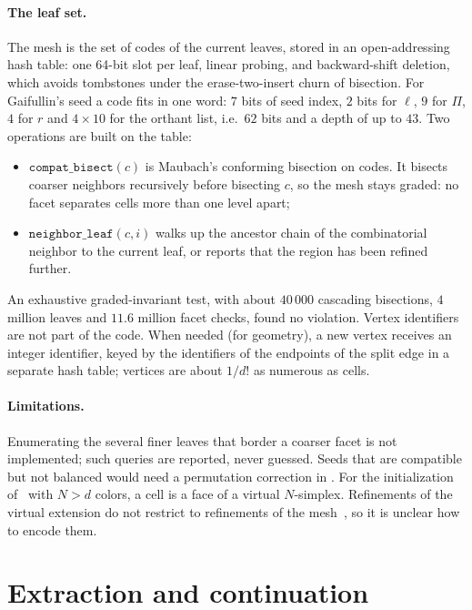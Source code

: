 \documentclass[11pt]{article}
\theoremstyle{plain}
\theoremstyle{definition}
\theoremstyle{remark}
\begin{document}
\paragraph{The leaf set.}
\label{sec:leafset}
The mesh is the set of codes of the current leaves, stored in an
open-addressing hash table: one 64-bit slot per leaf, linear probing,
and backward-shift deletion, which avoids tombstones under the
erase-two-insert churn of bisection. For Gaifullin's seed a code fits in
one word: $7$ bits of seed index, $2$ bits for $\ell$, $9$ for $\Pi$, $4$
for $r$ and $4\times10$ for the orthant list, i.e.\ $62$ bits and a depth of
up to $43$. Two operations are built on the table:
\begin{itemize}[itemsep=2pt]
\item $\texttt{compat\_bisect}(c)$ is Maubach's conforming bisection on
  codes. It bisects coarser neighbors recursively before bisecting $c$,
  so the mesh stays graded: no facet separates cells more than one level
  apart;
\item $\texttt{neighbor\_leaf}(c,i)$ walks up the ancestor chain of the
  combinatorial neighbor to the current leaf, or reports that the region
  has been refined further.
\end{itemize}
An exhaustive graded-invariant test, with about $40\,000$ cascading
bisections, $4$ million leaves and $11.6$ million facet checks, found no
violation. Vertex identifiers are not part of the code. When needed
(for geometry), a new vertex receives an integer identifier, keyed by the
identifiers of the endpoints of the split edge in a separate hash table;
vertices are about $1/d!$ as numerous as cells.

\paragraph{Limitations.}
Enumerating the several finer leaves that border a coarser facet is not
implemented; such queries are reported, never guessed. Seeds that are
compatible but not balanced would need a permutation correction in
. For the initialization of~\cite{dgs2025} with $N>d$
colors, a cell is a face of a virtual $N$-simplex. Refinements of the
virtual extension do not restrict to refinements of the
mesh~\cite[Rem.~12]{dgs2025}, so it is unclear how to encode them.

\section{Extraction and continuation}
\label{sec:extraction}
\end{document}
